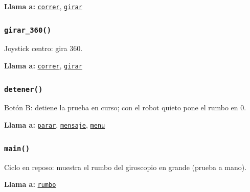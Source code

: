 \noindent\textbf{Llama a:} \hyperref[fn:funciones_rover:correr]{\texttt{correr}}, \hyperref[fn:funciones_rover:girar]{\texttt{girar}}\par

\subsubsection{\texttt{girar\_\allowbreak{}360()}}\label{fn:funciones_rover:girar-360}
\noindent Joystick centro: gira 360\textdegree{}.

\noindent\textbf{Llama a:} \hyperref[fn:funciones_rover:correr]{\texttt{correr}}, \hyperref[fn:funciones_rover:girar]{\texttt{girar}}\par

\subsubsection{\texttt{detener()}}\label{fn:funciones_rover:detener}
\noindent Botón B: detiene la prueba en curso; con el robot quieto pone el rumbo en 0.

\noindent\textbf{Llama a:} \hyperref[fn:funciones_rover:parar]{\texttt{parar}}, \hyperref[fn:funciones_rover:mensaje]{\texttt{mensaje}}, \hyperref[fn:funciones_rover:menu]{\texttt{menu}}\par

\subsubsection{\texttt{main()}}\label{fn:funciones_rover:main}
\noindent Ciclo en reposo: muestra el rumbo del giroscopio en grande (prueba a mano).

\noindent\textbf{Llama a:} \hyperref[fn:funciones_rover:rumbo]{\texttt{rumbo}}\par

